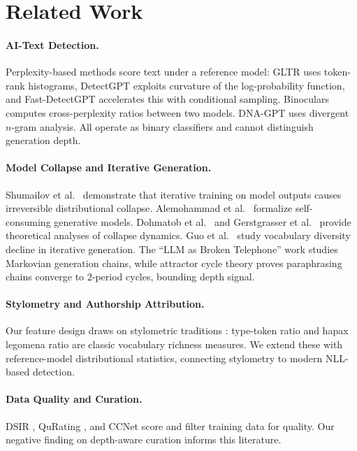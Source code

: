 \documentclass[11pt,a4paper]{article}
\begin{document}
\section{Related Work}

\paragraph{AI-Text Detection.}
Perplexity-based methods score text under a reference model: GLTR \cite{gehrmann2019gltr} uses token-rank histograms, DetectGPT \cite{mitchell2023detectgpt} exploits curvature of the log-probability function, and Fast-DetectGPT \cite{bao2024fastdetectgpt} accelerates this with conditional sampling. Binoculars \cite{hans2024binoculars} computes cross-perplexity ratios between two models. DNA-GPT \cite{yang2023dnagpt} uses divergent $n$-gram analysis. All operate as binary classifiers and cannot distinguish generation depth.

\paragraph{Model Collapse and Iterative Generation.}
Shumailov et al.\ \cite{shumailov2024model} demonstrate that iterative training on model outputs causes irreversible distributional collapse. Alemohammad et al.\ \cite{alemohammad2023selfconsuming} formalize self-consuming generative models. Dohmatob et al.\ \cite{dohmatob2024model} and Gerstgrasser et al.\ \cite{gerstgrasser2024model} provide theoretical analyses of collapse dynamics. Guo et al.\ \cite{guo2024curious} study vocabulary diversity decline in iterative generation. The ``LLM as Broken Telephone'' work \cite{brokentelephone2025} studies Markovian generation chains, while attractor cycle theory \cite{kovacs2025attractor} proves paraphrasing chains converge to 2-period cycles, bounding depth signal.

\paragraph{Stylometry and Authorship Attribution.}
Our feature design draws on stylometric traditions \cite{stamatatos2009survey,koppel2009computational}: type-token ratio and hapax legomena ratio are classic vocabulary richness measures. We extend these with reference-model distributional statistics, connecting stylometry to modern NLL-based detection.

\paragraph{Data Quality and Curation.}
DSIR \cite{xie2023data}, QuRating \cite{wettig2024qurating}, and CCNet \cite{wenzek2020ccnet} score and filter training data for quality. Our negative finding on depth-aware curation informs this literature.
\end{document}
